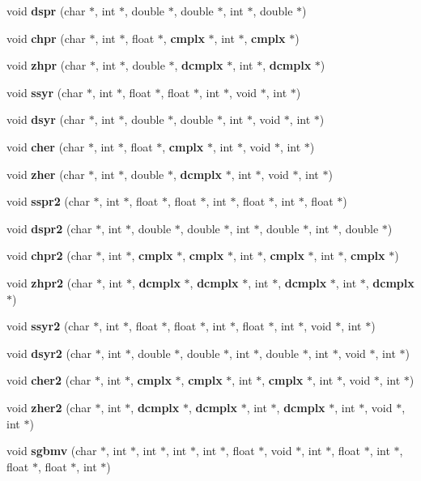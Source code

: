 \begin{CompactItemize}
void {\bf dspr} (char $\ast$, int $\ast$, double $\ast$, double $\ast$, int $\ast$, double $\ast$)
\item 
void {\bf chpr} (char $\ast$, int $\ast$, float $\ast$, {\bf cmplx} $\ast$, int $\ast$, {\bf cmplx} $\ast$)
\item 
void {\bf zhpr} (char $\ast$, int $\ast$, double $\ast$, {\bf dcmplx} $\ast$, int $\ast$, {\bf dcmplx} $\ast$)
\item 
void {\bf ssyr} (char $\ast$, int $\ast$, float $\ast$, float $\ast$, int $\ast$, void $\ast$, int $\ast$)
\item 
void {\bf dsyr} (char $\ast$, int $\ast$, double $\ast$, double $\ast$, int $\ast$, void $\ast$, int $\ast$)
\item 
void {\bf cher} (char $\ast$, int $\ast$, float $\ast$, {\bf cmplx} $\ast$, int $\ast$, void $\ast$, int $\ast$)
\item 
void {\bf zher} (char $\ast$, int $\ast$, double $\ast$, {\bf dcmplx} $\ast$, int $\ast$, void $\ast$, int $\ast$)
\item 
void {\bf sspr2} (char $\ast$, int $\ast$, float $\ast$, float $\ast$, int $\ast$, float $\ast$, int $\ast$, float $\ast$)
\item 
void {\bf dspr2} (char $\ast$, int $\ast$, double $\ast$, double $\ast$, int $\ast$, double $\ast$, int $\ast$, double $\ast$)
\item 
void {\bf chpr2} (char $\ast$, int $\ast$, {\bf cmplx} $\ast$, {\bf cmplx} $\ast$, int $\ast$, {\bf cmplx} $\ast$, int $\ast$, {\bf cmplx} $\ast$)
\item 
void {\bf zhpr2} (char $\ast$, int $\ast$, {\bf dcmplx} $\ast$, {\bf dcmplx} $\ast$, int $\ast$, {\bf dcmplx} $\ast$, int $\ast$, {\bf dcmplx} $\ast$)
\item 
void {\bf ssyr2} (char $\ast$, int $\ast$, float $\ast$, float $\ast$, int $\ast$, float $\ast$, int $\ast$, void $\ast$, int $\ast$)
\item 
void {\bf dsyr2} (char $\ast$, int $\ast$, double $\ast$, double $\ast$, int $\ast$, double $\ast$, int $\ast$, void $\ast$, int $\ast$)
\item 
void {\bf cher2} (char $\ast$, int $\ast$, {\bf cmplx} $\ast$, {\bf cmplx} $\ast$, int $\ast$, {\bf cmplx} $\ast$, int $\ast$, void $\ast$, int $\ast$)
\item 
void {\bf zher2} (char $\ast$, int $\ast$, {\bf dcmplx} $\ast$, {\bf dcmplx} $\ast$, int $\ast$, {\bf dcmplx} $\ast$, int $\ast$, void $\ast$, int $\ast$)
\item 
void {\bf sgbmv} (char $\ast$, int $\ast$, int $\ast$, int $\ast$, int $\ast$, float $\ast$, void $\ast$, int $\ast$, float $\ast$, int $\ast$, float $\ast$, float $\ast$, int $\ast$)

\end{CompactItemize}
